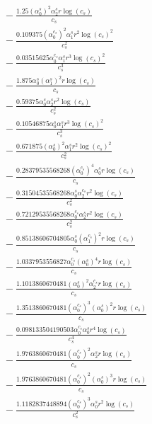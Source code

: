 \documentclass[10pt]{article}
\begin{document}
\begin{align*}
&{}  - \frac{1.25 \left(\alpha_{0}^s\right)^{2} \alpha_{2}^s r \log{\left(c_{s} \right)}}{c_{s}} \\
&{}  - \frac{0.109375 \left(\alpha_{0}^{c_s}\right)^{2} \alpha_{1}^s r^{2} \log{\left(c_{s} \right)}^{2}}{c_{s}^{2}} \\
&{}  - \frac{0.03515625 \alpha_{0}^{c_s} \alpha_{1}^s r^{3} \log{\left(c_{s} \right)}^{2}}{c_{s}^{3}} \\
&{}  - \frac{1.875 \alpha_{0}^s \left(\alpha_{1}^s\right)^{2} r \log{\left(c_{s} \right)}}{c_{s}} \\
&{}  - \frac{0.59375 \alpha_{0}^s \alpha_{2}^s r^{2} \log{\left(c_{s} \right)}}{c_{s}^{2}} \\
&{}  - \frac{0.10546875 \alpha_{0}^s \alpha_{1}^s r^{3} \log{\left(c_{s} \right)}^{2}}{c_{s}^{3}} \\
&{}  - \frac{0.671875 \left(\alpha_{0}^s\right)^{2} \alpha_{1}^s r^{2} \log{\left(c_{s} \right)}^{2}}{c_{s}^{2}} \\
&{}  - \frac{0.28379535568268 \left(\alpha_{0}^{c_s}\right)^{4} \alpha_{0}^s r \log{\left(c_{s} \right)}}{c_{s}} \\
&{}  - \frac{0.31504535568268 \alpha_{0}^s \alpha_{2}^{c_s} r^{2} \log{\left(c_{s} \right)}}{c_{s}^{2}} \\
&{}  - \frac{0.72129535568268 \alpha_{0}^{c_s} \alpha_{2}^s r^{2} \log{\left(c_{s} \right)}}{c_{s}^{2}} \\
&{}  - \frac{0.85138606704805 \alpha_{0}^s \left(\alpha_{1}^{c_s}\right)^{2} r \log{\left(c_{s} \right)}}{c_{s}} \\
&{}  - \frac{1.0337953556827 \alpha_{0}^{c_s} \left(\alpha_{0}^s\right)^{4} r \log{\left(c_{s} \right)}}{c_{s}} \\
&{}  - \frac{1.1013860670481 \left(\alpha_{0}^s\right)^{2} \alpha_{2}^{c_s} r \log{\left(c_{s} \right)}}{c_{s}} \\
&{}  - \frac{1.3513860670481 \left(\alpha_{0}^{c_s}\right)^{3} \left(\alpha_{0}^s\right)^{2} r \log{\left(c_{s} \right)}}{c_{s}} \\
&{}  - \frac{0.098133504190503 \alpha_{0}^{c_s} \alpha_{0}^s r^{4} \log{\left(c_{s} \right)}}{c_{s}^{4}} \\
&{}  - \frac{1.9763860670481 \left(\alpha_{0}^{c_s}\right)^{2} \alpha_{2}^s r \log{\left(c_{s} \right)}}{c_{s}} \\
&{}  - \frac{1.9763860670481 \left(\alpha_{0}^{c_s}\right)^{2} \left(\alpha_{0}^s\right)^{3} r \log{\left(c_{s} \right)}}{c_{s}} \\
&{}  - \frac{1.1182837448894 \left(\alpha_{0}^{c_s}\right)^{3} \alpha_{0}^s r^{2} \log{\left(c_{s} \right)}}{c_{s}^{2}} \\

\end{align*}
\end{document}
